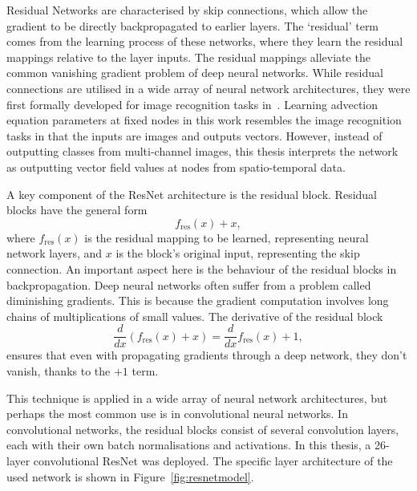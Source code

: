 Residual Networks are characterised by skip connections, which allow the gradient to be directly backpropagated to earlier layers.
The ‘residual’ term comes from the learning process of these networks, where they learn the residual mappings relative to the layer inputs.
The residual mappings alleviate the common vanishing gradient problem of deep neural networks.
While residual connections are utilised in a wide array of neural network architectures, they were first formally developed for image recognition tasks in~\cite{resnet}.
Learning advection equation parameters at fixed nodes in this work resembles the image recognition tasks in that the inputs are images and outputs vectors.
However, instead of outputting classes from multi-channel images, this thesis interprets the network as outputting vector field values at nodes from spatio-temporal data.

A key component of the ResNet architecture is the residual block.
Residual blocks have the general form
\begin{equation}\label{eq:residualblock}
    f_{\operatorname{res}}(x) + x,
\end{equation}
where $f_{\operatorname{res}}(x)$ is the residual mapping to be learned, representing neural network layers, and $x$ is the block's original input, representing the skip connection.
An important aspect here is the behaviour of the residual blocks in backpropagation.
Deep neural networks often suffer from a problem called diminishing gradients.
This is because the gradient computation involves long chains of multiplications of small values.
The derivative of the residual block
\begin{equation}\label{eq:residualblockderivative}
    \frac{d}{dx} (f_{\operatorname{res}}(x) + x) = \frac{d}{dx} f_{\operatorname{res}}(x) + 1,
\end{equation}
ensures that even with propagating gradients through a deep network, they don't vanish, thanks to the $+1$ term.

This technique is applied in a wide array of neural network architectures, but perhaps the most common use is in convolutional neural networks.
In convolutional networks, the residual blocks consist of several convolution layers, each with their own batch normalisations and activations.
In this thesis, a 26-layer convolutional ResNet was deployed.
The specific layer architecture of the used network is shown in Figure~\ref{fig:resnetmodel}.

